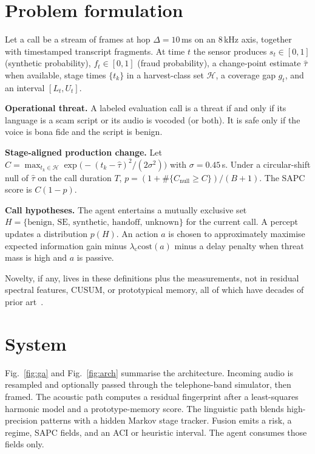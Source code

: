 \documentclass[11pt]{article}
\begin{document}
\section{Problem formulation}

Let a call be a stream of frames at hop $\Delta=10$\,ms on an $8$\,kHz axis, together with timestamped transcript fragments. At time $t$ the sensor produces $s_t\in[0,1]$ (synthetic probability), $f_t\in[0,1]$ (fraud probability), a change-point estimate $\hat\tau$ when available, stage times $\{t_k\}$ in a harvest-class set $\mathcal{H}$, a coverage gap $g_t$, and an interval $[L_t,U_t]$.

\noindent\textbf{Operational threat.}
A labeled evaluation call is a threat if and only if its language is a scam script or its audio is vocoded (or both). It is safe only if the voice is bona fide and the script is benign.

\noindent\textbf{Stage-aligned production change.}
Let $C=\max_{t_k\in\mathcal{H}}\exp\bigl(-(t_k-\hat\tau)^2/(2\sigma^2)\bigr)$ with $\sigma=0.45$\,s. Under a circular-shift null of $\hat\tau$ on the call duration $T$, $p=(1+\#\{C_{\mathrm{null}}\ge C\})/(B+1)$. The SAPC score is $C(1-p)$.

\noindent\textbf{Call hypotheses.}
The agent entertains a mutually exclusive set $H=\{\mathrm{benign},\,\mathrm{SE},\,\mathrm{synthetic},\,\mathrm{handoff},\,\mathrm{unknown}\}$ for the current call. A percept updates a distribution $p(H)$. An action $a$ is chosen to approximately maximise expected information gain minus $\lambda_{\mathrm{c}}\mathrm{cost}(a)$ minus a delay penalty when threat mass is high and $a$ is passive.

Novelty, if any, lives in these definitions plus the measurements, not in residual spectral features, CUSUM, or prototypical memory, all of which have decades of prior art~\cite{page1954cusum,snell2017prototypical,griffin1984signal}.

\section{System}

Fig.~\ref{fig:ga} and Fig.~\ref{fig:arch} summarise the architecture. Incoming audio is resampled and optionally passed through the telephone-band simulator, then framed. The acoustic path computes a residual fingerprint after a least-squares harmonic model and a prototype-memory score. The linguistic path blends high-precision patterns with a hidden Markov stage tracker. Fusion emits a risk, a regime, SAPC fields, and an ACI or heuristic interval. The agent consumes those fields only.
\end{document}
